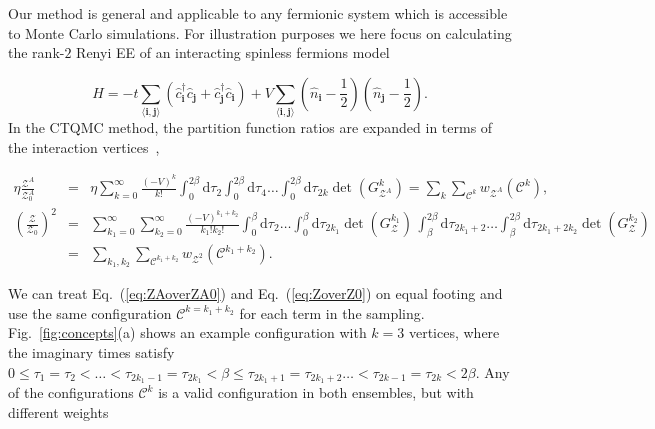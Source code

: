 \documentclass[twocolumn,english,prl,showpacs]{revtex4}
\begin{document}
Our method is general and applicable to any fermionic system which is accessible to Monte Carlo simulations. For illustration purposes we here focus on calculating the rank-$2$ Renyi EE of an interacting spinless fermions model 

\begin{equation}
 \hat{H}= -t \sum_{\langle \mathbf{i,j}\rangle}\left(  \hat{c}_{\mathbf{i}}^{\dagger} \hat{c}_{\mathbf{j}} +  \hat{c}_{\mathbf{j}}^{\dagger} \hat{c}_{\mathbf{i}}  \right) + V \sum_{\langle \mathbf{i,j} \rangle} \left( \hat{n}_{\mathbf{i}} - \frac{1}{2}
  \right) \left( \hat{n}_{\mathbf{j}} - \frac{1}{2} \right). 
 \label{eq:Ham}
\end{equation} 
In the CTQMC method, the partition function ratios are expanded in terms of the interaction vertices~\cite{Rubtsov:2005iw, Gull:2011jd, CTQMCpaper}, 

\begin{widetext}
\begin{eqnarray}
\eta \frac{\mathcal{Z}^{A}}{\mathcal{Z}_{0}^{A}}  & =& \eta \sum_{k=0}^{\infty} 
\frac{(-V)^{k}}{k!} \int_{0}^{2\beta}\mathrm{d} \tau_{2} \int_{0}^{2\beta}\mathrm{d} \tau_{4}  \ldots \int_{0}^{2\beta} \mathrm{d}\tau_{2k}   \det\left(G^{k}_{\mathcal{Z}^{A}}\right) \label{eq:ZAoverZA0}  =  \sum_{k}\sum_{\mathcal{C}^{k}} w_{\mathcal{Z}^{A}}(\mathcal{C}^{k}), \\   
\left(\frac{\mathcal{Z}}{\mathcal{Z}_{0}}\right)^{2} & =& \sum_{k_{1}=0}^{\infty} \sum_{k_{2}=0}^{\infty} 
\frac{(-V)^{k_{1}+k_{2}}}{k_{1}!k_{2}!}  \int_{0}^{\beta} \mathrm{d}\tau_{2} \ldots \int_{0}^{\beta} \mathrm{d}\tau_{2k_{1}} \det(G_{\mathcal{Z}}^{k_{1}}) \, \int_{\beta}^{2\beta} \mathrm{d}\tau_{2k_{1}+2} \ldots \int_{\beta}^{2\beta} \mathrm{d}\tau_{2k_{1}+2k_{2}}\det{(G_{\mathcal{Z}}^{k_{2}})} \nonumber \\& =& \sum_{k_{1},k_{2}}\sum_{\mathcal{C}^{k_{1}+k_{2}}} w_{\mathcal{Z}^{2}}(\mathcal{C}^{k_{1}+k_{2}}).
\label{eq:ZoverZ0}
\end{eqnarray}
\end{widetext}
We can treat Eq.~(\ref{eq:ZAoverZA0}) and Eq.~(\ref{eq:ZoverZ0}) on equal footing and use the same configuration $\mathcal{C}^{k=k_{1}+k_{2}}$ for each term in the sampling.  Fig.~\ref{fig:concepts}(a) shows an example configuration with $k=3$ vertices, where the imaginary times satisfy $0\le\tau_{1}=\tau_{2} < \ldots < \tau_{2k_{1}-1} = \tau_{2k_{1}} < \beta \le \tau_{2k_{1}+1}= \tau_{2k_{1}+2}  \ldots < \tau_{2k-1} = \tau_{2k} < 2\beta $. Any of the configurations $\mathcal{C}^{k}$ is a valid configuration in both ensembles, but with different weights 
\end{document}
